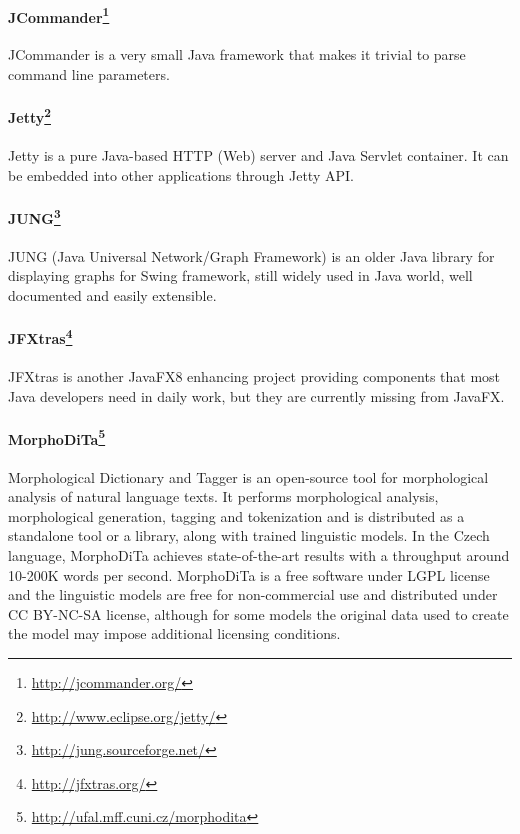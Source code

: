 \paragraph{JCommander\footnote{\url{http://jcommander.org/}}}
JCommander is a very small Java framework that makes it trivial to parse command
line parameters.

\paragraph{Jetty\footnote{\url{http://www.eclipse.org/jetty/}}}
Jetty is a pure Java-based HTTP (Web) server and Java Servlet container. It can
be embedded into other applications through Jetty API.

\paragraph{JUNG\footnote{\url{http://jung.sourceforge.net/}}}
JUNG (Java Universal Network/Graph Framework) is an older Java library for
displaying graphs for Swing framework, still widely used in Java world, well documented and easily extensible.

\paragraph{JFXtras\footnote{\url{http://jfxtras.org/}}}
JFXtras is another JavaFX8 enhancing project providing components that
most Java developers need in daily work, but they are currently missing
from JavaFX.

\paragraph{MorphoDiTa\footnote{\url{http://ufal.mff.cuni.cz/morphodita}}}
Morphological Dictionary and Tagger is an open-source tool for morphological
analysis of natural language texts. It performs morphological analysis, 
morphological generation, tagging and tokenization and is distributed as
a standalone tool or a library, along with trained linguistic models. In
the Czech language, MorphoDiTa achieves state-of-the-art results with 
a throughput around 10-200K words per second. MorphoDiTa is a free software
under LGPL license and the linguistic models are free for non-commercial use
and distributed under CC BY-NC-SA license, although for some models the original
data used to create the model may impose additional licensing conditions.

